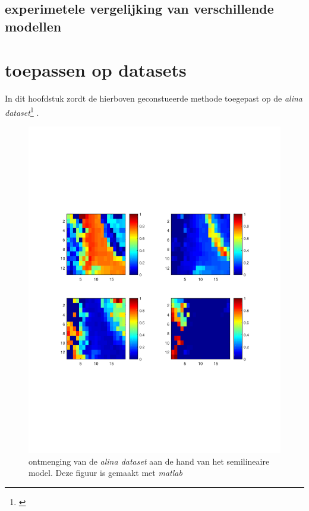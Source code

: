 \documentclass[12pt]{report}
\newcommand{\footcite}[1]{\cite{#1}\let\thefootnote\relax \footnote{\cite{#1} \bibentry{#1}} }
\begin{document}
\section{experimetele vergelijking van verschillende modellen}






\chapter{toepassen op datasets}

In dit hoofdstuk zordt de hierboven geconstueerde methode toegepast op de \textit{alina dataset}\footcite{alina}.

\begin{figure}
\includegraphics[width=0.99\linewidth,trim=0 200 0 175 cm]{semilinMESMA.pdf}
\caption{ontmenging van de \textit{alina dataset}\cite{alina} aan de hand van het semilineaire model. Deze figuur is gemaakt met \textit{matlab}\cite{MATLAB} \label{fig:asl}}
\end{figure}
\end{document}
